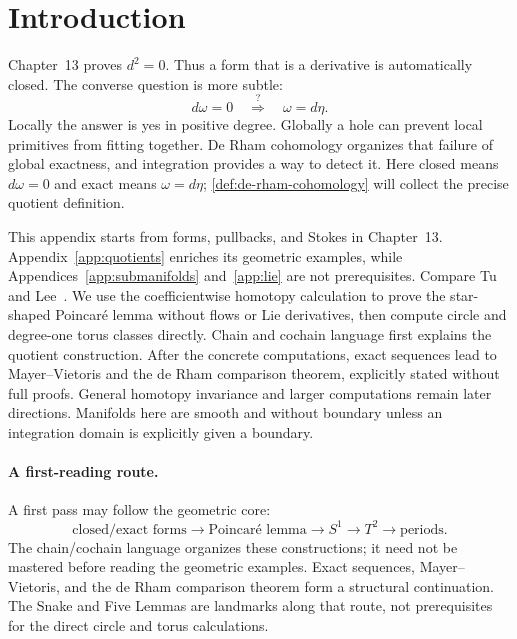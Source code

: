 \label{app:cohomology}
\section*{Introduction}
Chapter~13 proves $d^2=0$. Thus a form that is a derivative is automatically
closed. The converse question is more subtle:
\[
d\omega=0\quad\stackrel{?}{\Longrightarrow}\quad\omega=d\eta.
\]
Locally the answer is yes in positive degree. Globally a hole can prevent
local primitives from fitting together. De Rham cohomology organizes that
failure of global exactness, and integration provides a way to detect it.
Here closed means $d\omega=0$ and exact means $\omega=d\eta$;
\cref{def:de-rham-cohomology} will collect the precise quotient definition.

This appendix starts from forms, pullbacks, and Stokes in Chapter~13.
Appendix~\ref{app:quotients} enriches its geometric examples, while
Appendices~\ref{app:submanifolds} and~\ref{app:lie} are not prerequisites.
Compare Tu~\cite[\S\S24--29]{tu-manifolds} and
Lee~\cite[Chapters 17--18]{lee-smooth}. We use the coefficientwise
homotopy calculation to prove the star-shaped Poincar\'e lemma without
flows or Lie derivatives, then compute circle and degree-one torus classes
directly. Chain and cochain language first explains the quotient construction.
After the concrete computations, exact sequences lead to Mayer--Vietoris
and the de Rham comparison theorem, explicitly stated without full proofs.
General homotopy invariance and larger computations remain later directions. Manifolds here are smooth and without
boundary unless an integration domain is explicitly given a boundary.

\paragraph{A first-reading route.}
A first pass may follow the geometric core:
\[
\text{closed/exact forms}\longrightarrow\text{Poincar\'e lemma}
\longrightarrow S^1\longrightarrow T^2\longrightarrow\text{periods}.
\]
The chain/cochain language organizes these constructions; it need not be
mastered before reading the geometric examples. Exact sequences,
Mayer--Vietoris, and the de Rham comparison theorem form a structural
continuation. The Snake and Five Lemmas are landmarks along that route,
not prerequisites for the direct circle and torus calculations.

